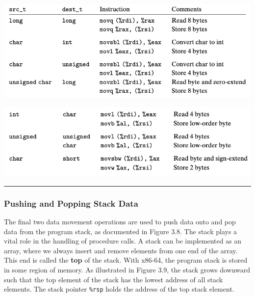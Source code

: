 \documentclass[11pt]{article}
\begin{document}
\begin{center}
\includegraphics[width=.9\linewidth]{pics/move-practice-3.png}
\end{center}

\begin{center}
\includegraphics[width=.9\linewidth]{pics/move-practice-4.png}
\end{center}

\noindent\rule{\textwidth}{0.5pt}

\subsubsection{Pushing and Popping Stack Data}
\label{sec:orgff3ff40}
The final two data movement operations are used to push data onto and pop data from the program stack, as documented in Figure 3.8. The stack plays a vital role in the handling of procedure calls. A stack can be implemented as an array, where we always insert and remove elements from one end of the array. This end is called the \textbf{top} of the stack. With x86-64, the program stack is stored in some region of memory. As illustrated in Figure 3.9, the stack grows downward such that the top element of the stack has the lowest address of all stack elements. The stack pointer \texttt{\%rsp} holds the address of the top stack element.\\
\end{document}

